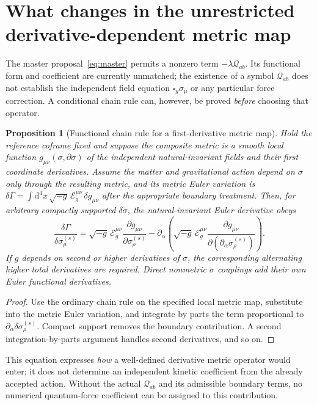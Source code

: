 \documentclass[11pt,a4paper]{article}
\newtheorem{proposition}[theorem]{Proposition}
\newcommand{\dd}{\mathrm d}
\begin{document}
\section{What changes in the unrestricted derivative-dependent metric map}
\label{sec:derivativemap}
The master proposal~\eqref{eq:master} permits a nonzero term
$-\lambda\mathcal Q_{ab}$. Its functional form and coefficient are
currently unmatched; the existence of a symbol $\mathcal Q_{ab}$
does not establish the independent field equation $\square_g\sigma_\mu$
or any particular force correction. A conditional chain rule can,
however, be proved \emph{before} choosing that operator.

\begin{proposition}[Functional chain rule for a first-derivative metric map]
\label{prop:jet}
Hold the reference coframe fixed and suppose the composite metric is a
smooth local function $g_{\mu\nu}(\sigma,\partial\sigma)$ of the
independent natural-invariant fields and their first coordinate
derivatives. Assume the matter and gravitational action depend on
$\sigma$ only through the resulting metric, and its metric Euler
variation is
$\delta\Gamma=\int\dd^4x\,\sqrt{-g}\,\mathcal E_g^{\mu\nu}\,
\delta g_{\mu\nu}$ after the appropriate boundary treatment.
Then, for arbitrary compactly supported $\delta\sigma$, the
natural-invariant Euler derivative obeys
\begin{equation}\label{eq:jet}
\boxed{\displaystyle
\frac{\delta\Gamma}{\delta\sigma^{(s)}_\rho}
=\sqrt{-g}\,\mathcal E_g^{\mu\nu}
\frac{\partial g_{\mu\nu}}{\partial\sigma^{(s)}_\rho}
-\partial_\alpha\!\left(
\sqrt{-g}\,\mathcal E_g^{\mu\nu}
\frac{\partial g_{\mu\nu}}
{\partial(\partial_\alpha\sigma^{(s)}_\rho)}\right).}
\end{equation}
If $g$ depends on second or higher derivatives of $\sigma$, the
corresponding alternating higher total derivatives are required.
Direct nonmetric $\sigma$ couplings add their \emph{own} Euler
functional derivatives.
\end{proposition}
\begin{proof}
Use the ordinary chain rule on the specified local metric map,
substitute into the metric Euler variation, and integrate by parts
the term proportional to
$\partial_\alpha\delta\sigma^{(s)}_\rho$. Compact support removes
the boundary contribution. A second integration-by-parts argument
handles second derivatives, and so on.
\end{proof}
This equation expresses \emph{how} a well-defined derivative metric
operator would enter; it does not determine an independent kinetic
coefficient from the already accepted action. Without the actual
$\mathcal Q_{ab}$ and its admissible boundary terms, no numerical
quantum-force coefficient can be assigned to this contribution.
\end{document}

